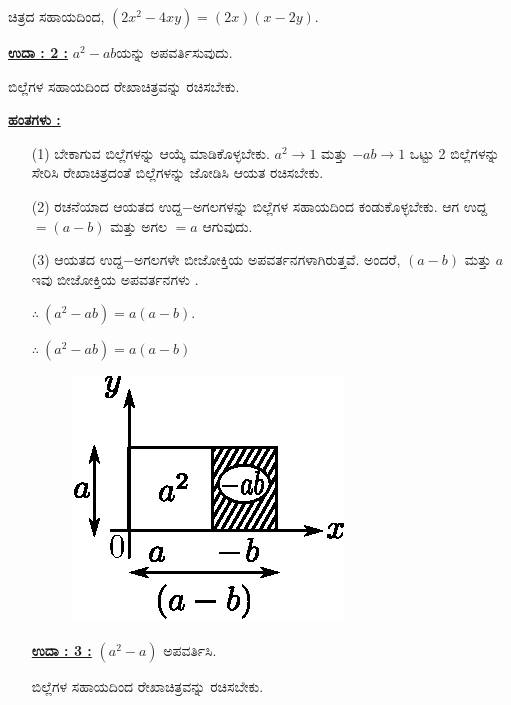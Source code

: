 ಚಿತ್ರದ ಸಹಾಯದಿಂದ, $(2x^2 - 4xy) = (2x)(x-2y).$

\noindent
{\textbf{\underline{ಉದಾ : 2 :}}} $a^2 - ab$ಯನ್ನು ಅಪವರ್ತಿಸುವುದು. 

ಬಿಲ್ಲೆಗಳ ಸಹಾಯದಿಂದ ರೇಖಾಚಿತ್ರವನ್ನು ರಚಿಸಬೇಕು.

\noindent
{\textbf{\underline{ಹಂತಗಳು :}}}
\begin{itemize}
\item [(1)] ಬೇಕಾಗುವ ಬಿಲ್ಲೆಗಳನ್ನು ಆಯ್ಕೆ ಮಾಡಿಕೊಳ್ಳಬೇಕು. $a^2 \rightarrow 1$ ಮತ್ತು $-ab \rightarrow 1$ ಒಟ್ಟು 2 ಬಿಲ್ಲೆಗಳನ್ನು ಸೇರಿಸಿ ರೇಖಾಚಿತ್ರದಂತೆ ಬಿಲ್ಲೆಗಳನ್ನು ಜೋಡಿಸಿ ಆಯತ ರಚಿಸಬೇಕು. 
\item [(2)] ರಚನೆಯಾದ ಆಯತದ ಉದ್ದ$-$ಅಗಲಗಳನ್ನು ಬಿಲ್ಲೆಗಳ ಸಹಾಯದಿಂದ ಕಂಡುಕೊಳ್ಳಬೇಕು. ಆಗ ಉದ್ದ $= (a-b)$ ಮತ್ತು ಅಗಲ $= a$ ಆಗುವುದು. 
\item [(3)] ಆಯತದ ಉದ್ದ$-$ಅಗಲಗಳೇ ಬೀಜೋಕ್ತಿಯ ಅಪವರ್ತನಗಳಾಗಿರುತ್ತವೆ. ಅಂದರೆ, $(a-b)$ ಮತ್ತು $a$ ಇವು ಬೀಜೋಕ್ತಿಯ ಅಪವರ್ತನಗಳು .

$\therefore~ (a^2 - ab) = a(a-b)$.


$\therefore \ (a^2 - ab) = a(a - b)$
\begin{figure}[H]
\centering
\includegraphics[scale=0.8]{src/figure/chap3/fig3-35b.eps}
\end{figure}

\noindent
{\textbf{\underline{ಉದಾ : 3 :}}} $(a^2 - a)$ ಅಪವರ್ತಿಸಿ. 

ಬಿಲ್ಲೆಗಳ ಸಹಾಯದಿಂದ ರೇಖಾಚಿತ್ರವನ್ನು ರಚಿಸಬೇಕು.
\end{itemize}

